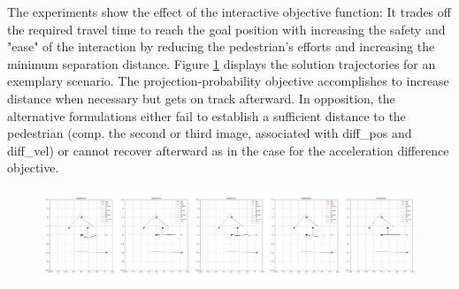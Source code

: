 The experiments show the effect of the interactive objective function: It trades off the required travel time to reach the goal position with increasing the safety and "ease" of the interaction by reducing the pedestrian's efforts and increasing the minimum separation distance. Figure \ref{img:interactive_comp} displays the solution trajectories for an exemplary scenario.  The projection-probability objective accomplishes to increase distance when necessary but gets on track afterward. In opposition, the alternative formulations either fail to establish a sufficient distance to the pedestrian (comp. the second or third image, associated with diff\_pos and diff\_vel) or cannot recover afterward as in the case for the acceleration difference objective.

\begin{figure}[!ht]
\begin{center}
\includegraphics[width=\textwidth]{images/inter_comp_multi.png}
\label{img:interactive_comp}
\end{center}
\end{figure}

